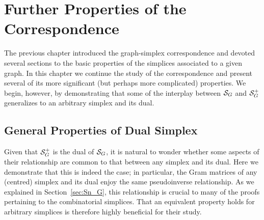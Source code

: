\chapter{Further Properties of the Correspondence}
\label{chap:further_properties}


The previous chapter introduced the graph-simplex correspondence and devoted several sections to the basic properties of the simplices associated to a given graph. In this chapter we  continue the study of the correspondence and present several of its more significant (but perhaps more complicated) properties.  We begin,  however, by demonstrating that  some of the interplay between $\mathcal{S}_G$ and $\mathcal{S}_G^+$ generalizes to an arbitrary simplex and its dual. 

\section{General Properties of Dual Simplex }
Given that $\mathcal{S}_G^+$  is the dual of $\mathcal{S}_G$, it is natural to wonder whether some aspects of  their relationship are common to that between any simplex and its dual.  
Here we demonstrate that this is indeed the case; in particular, the Gram matrices of any (centred) simplex and its dual enjoy  the same pseudoinverse relationship. 
As we explained in Section~\ref{sec:Sn_G}, this relationship  is crucial to many of the proofs pertaining to  the combinatorial  simplices.
That  an equivalent property  holds for arbitrary simplices is therefore highly beneficial for their  study. 

